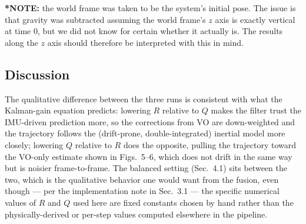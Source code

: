 \documentclass[11pt]{article}
\begin{document}
\textbf{*NOTE:} the world frame was taken to be the system's initial pose.
The issue is that gravity was subtracted assuming the world frame's $z$ axis is exactly vertical at
time 0, but we did not know for certain whether it actually is. The results along the $z$ axis should
therefore be interpreted with this in mind.

\subsection*{Discussion}
The qualitative difference between the three runs is consistent with what the Kalman-gain equation
predicts: lowering $R$ relative to $Q$ makes the filter trust the IMU-driven prediction more, so the
corrections from VO are down-weighted and the trajectory follows the (drift-prone, double-integrated)
inertial model more closely; lowering $Q$ relative to $R$ does the opposite, pulling the trajectory
toward the VO-only estimate shown in Figs.~5--6, which does not drift in the same way but is noisier
frame-to-frame. The balanced setting (Sec.~4.1) sits between the two, which is the qualitative
behavior one would want from the fusion, even though — per the implementation note in Sec.~3.1 — the
specific numerical values of $R$ and $Q$ used here are fixed constants chosen by hand rather than the
physically-derived or per-step values computed elsewhere in the pipeline.
\end{document}
